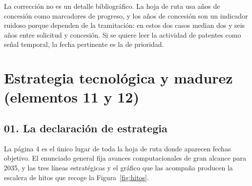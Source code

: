 \documentclass[11pt,letterpaper]{article}
\begin{document}
La corrección no es un detalle bibliográfico. La hoja de ruta usa años de
concesión como marcadores de progreso, y los años de concesión son un
indicador ruidoso porque dependen de la tramitación: en estos dos casos median
dos y seis años entre solicitud y concesión. Si se quiere leer la actividad de
patentes como señal temporal, la fecha pertinente es la de prioridad.

\section{Estrategia tecnológica y madurez (elementos 11 y 12)}

\subsection*{01. La declaración de estrategia}

La página 4 es el único lugar de toda la hoja de ruta donde aparecen fechas
objetivo. El enunciado general fija avances computacionales de gran alcance
para 2035, y las tres líneas estratégicas y el gráfico que las acompaña
producen la escalera de hitos que recoge la Figura~\ref{fig:hitos}.
\end{document}
